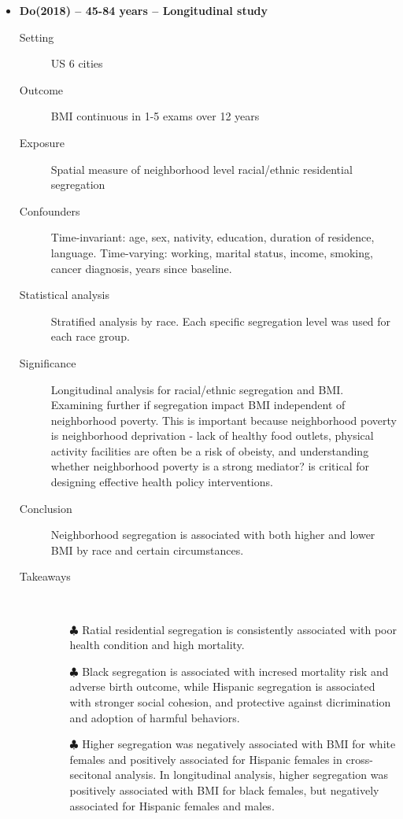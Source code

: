 \documentclass{article}
\begin{document}
\begin{itemize}
\begin{description}
\begin{itemize}
				\end{itemize} 
			
		\end{description}

\newpage
\item{\bf Do(2018) -- 45-84 years  -- Longitudinal study}
		\begin{description}
			\item[Setting] US 6 cities
			\item[Outcome] BMI continuous in 1-5 exams over 12 years
			\item[Exposure] Spatial measure of neighborhood level racial/ethnic residential segregation
			\item[Confounders] Time-invariant: age, sex, nativity, education, duration of residence, language. Time-varying: working, marital status, income, smoking, cancer diagnosis, years since baseline.
			\item[Statistical analysis] Stratified analysis by race. Each specific segregation level was used for each race group.
			\item[Significance] Longitudinal analysis for racial/ethnic segregation and BMI. Examining further if segregation impact BMI independent of neighborhood poverty. This is important because neighborhood poverty is neighborhood deprivation - lack of healthy food outlets, physical activity facilities are often be a risk of obeisty, and understanding whether neighborhood poverty is a strong mediator? is critical for designing effective health policy interventions.
			\item[Conclusion] Neighborhood segregation is associated with both higher and lower BMI by race and certain circumstances.
			\item[Takeaways] \mbox{}\\
				\begin{itemize}
					\item[$\clubsuit$] Ratial residential segregation is consistently associated with poor health condition and high mortality.
					\item[$\clubsuit$] Black segregation is associated with incresed mortality risk and adverse birth outcome, while Hispanic segregation is associated with stronger social cohesion, and protective against dicrimination and adoption of harmful behaviors.
					\item[$\clubsuit$] Higher segregation was negatively associated with BMI for white females and positively associated for Hispanic females in cross-secitonal analysis. In longitudinal analysis, higher segregation was positively associated with BMI for black females, but negatively associated for Hispanic females and males.
				\end{itemize} 
		\end{description}


\end{itemize}
\end{document}
